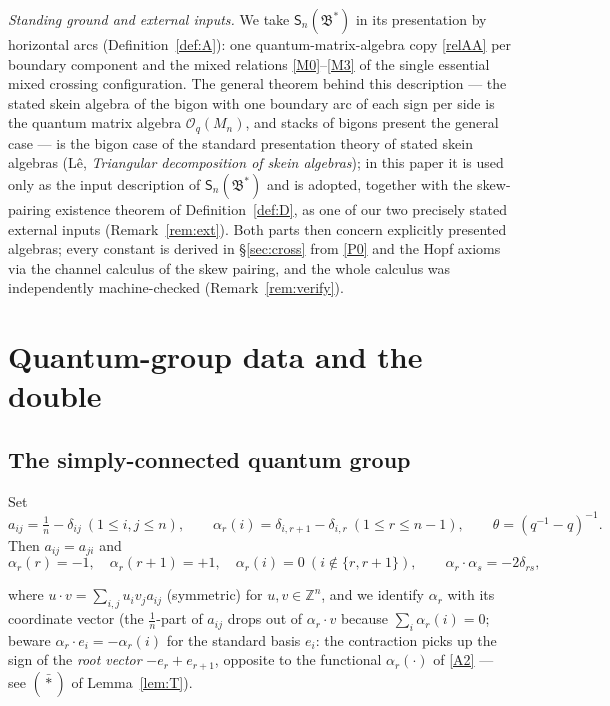\documentclass[11pt]{article}
\theoremstyle{definition}
\theoremstyle{remark}
\newcommand{\Z}{\mathbb{Z}}
\newcommand{\B}{\mathfrak{B}}
\newcommand{\Sn}{\mathsf{S}_n}
\newcommand{\del}{\delta}
\newcommand{\tht}{\theta}
\begin{document}
\noindent\emph{Standing ground and external inputs.}  We take
$\Sn(\B^*)$ in its presentation by horizontal arcs
(Definition~\ref{def:A}): one quantum-matrix-algebra copy
\eqref{relAA} per boundary component and the mixed relations
\eqref{M0}--\eqref{M3} of the single essential mixed crossing
configuration.  The general theorem behind this description — the
stated skein algebra of the bigon with one boundary arc of each sign
per side is the quantum matrix algebra $\mathcal O_q(M_n)$, and
stacks of bigons present the general case — is the bigon case of the
standard presentation theory of stated skein algebras (L\^e,
\emph{Triangular decomposition of skein algebras}); in this paper it
is used only as the input description of $\Sn(\B^*)$ and is adopted,
together with the skew-pairing existence theorem of
Definition~\ref{def:D}, as one of our two precisely stated external
inputs (Remark~\ref{rem:ext}).  Both parts then concern explicitly
presented algebras; every constant is derived in \S\ref{sec:cross}
from \eqref{P0} and the Hopf axioms via the channel calculus of the
skew pairing, and the whole calculus was independently
machine-checked (Remark~\ref{rem:verify}).

\section{Quantum-group data and the double}\label{sec:qg}

\subsection{The simply-connected quantum group}

Set
\[
a_{ij}=\tfrac1n-\del_{ij}\ (1\le i,j\le n),\qquad
\alpha_r(i)=\del_{i,r+1}-\del_{i,r}\ (1\le r\le n-1),\qquad
\tht=(q^{-1}-q)^{-1}.
\]
Then $a_{ij}=a_{ji}$ and
\begin{equation}
\alpha_r(r)=-1,\quad \alpha_r(r+1)=+1,\quad \alpha_r(i)=0\
(i\notin\{r,r+1\}),\qquad \alpha_r\cdot\alpha_s=-2\del_{rs},
\label{A2}\tag{A2}
\end{equation}

where $u\cdot v=\sum_{i,j}u_iv_ja_{ij}$ (symmetric) for
$u,v\in\Z^n$, and we identify $\alpha_r$ with its coordinate vector
(the $\tfrac1n$-part of $a_{ij}$ drops out of $\alpha_r\cdot v$
because $\sum_i\alpha_r(i)=0$; beware
$\alpha_r\cdot e_i=-\alpha_r(i)$ for the standard basis $e_i$:
the contraction picks up the sign of the \emph{root vector}
$-e_r+e_{r+1}$, opposite to the functional $\alpha_r(\cdot)$
of \eqref{A2} — see $(\bar\ast)$ of Lemma~\ref{lem:T}).
\end{document}
